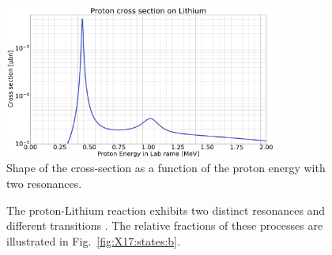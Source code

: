 \begin{refsection}
        \begin{figure}
            \centering
            \includegraphics[width = 0.8\textwidth]{Figures/X17/pLi_crossection.png}
            \caption{Shape of the cross-section as a function of the proton energy \cite{X17:crossections} with two resonances.}
            \label{fig:X17:resonance}
        \end{figure}
        
        \begin{figure}
            \centering
            \hfill
            \caption[Energy levels and transitions of ]{The proton-Lithium reaction exhibits two distinct resonances \cite{X17:crossections} and different transitions \cite{X17:Elevels:2004}. The relative fractions of these processes are illustrated in Fig.~\ref{fig:X17:states:b}.}
            \label{fig:X17:states}
        \end{figure}


\end{refsection}
